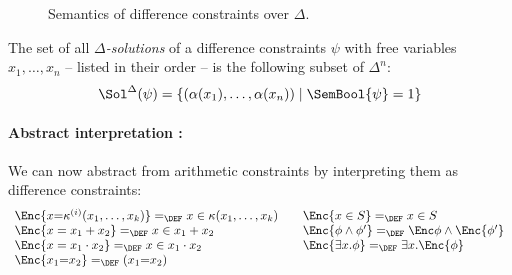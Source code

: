 \documentclass[a4paper,10pt]{article}
\begin{document}
\begin{figure}
\caption{\label{sem:dc}Semantics of difference constraints over
  $\Delta$.}
\end{figure}

The set of all \emph{$\Delta$-solutions} of a difference constraints $\psi$
with free variables $x_1,\ldots, x_n$ -- listed in their order -- is the
following subset of $\Delta^n$:
$$
  \Sol^\Delta(\psi) = \{(\alpha(x_1),\ldots,\alpha(x_n)) \mid
  \SemBool{\psi}= 1\}
$$

\paragraph{Abstract interpretation :}

We can now abstract from arithmetic constraints by
interpreting them as difference constraints:
$$
\begin{array}{l@{\qquad}l}
\Enc{x{=}\kappa^{(i)}(x_1,\ldots,x_k)} =_\DEF x\in
  \kappa(x_1,\ldots,x_k) &
\Enc{x\in S} =_\DEF x \in S 
\\
\Enc{x=x_1+x_2} =_\DEF x\in x_1+ x_2  &
\Enc{\phi\wedge\phi'} =_\DEF \Enc\phi\wedge\Enc{\phi'}   
\\
\Enc{x=x_1\cdot x_2} =_\DEF x\in x_1\cdot x_2 
&
\Enc{\exists x. \phi} =_\DEF \exists x.\Enc{\phi} 
\\
\Enc{x_1{=}x_2} =_\DEF (x_1{=}x_2)   
\end{array}
$$
\end{document}
